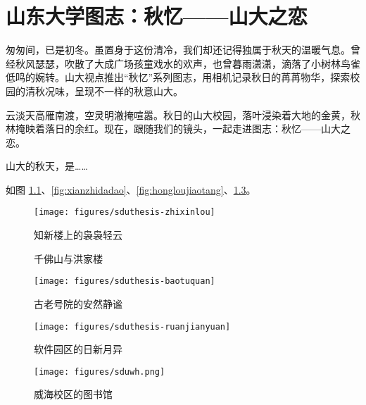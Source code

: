 \documentclass[openany]{sduthesis} %
\begin{document}
\chapter{山东大学图志：秋忆——山大之恋}

匆匆间，已是初冬。虽置身于这份清冷，我们却还记得独属于秋天的温暖气息。曾经秋风瑟瑟，吹散了大成广场孩童戏水的欢声，也曾暮雨潇潇，滴落了小树林鸟雀低鸣的婉转。山大视点推出“秋忆”系列图志，用相机记录秋日的苒苒物华，探索校园的清秋况味，呈现不一样的秋意山大。

云淡天高雁南渡，空灵明澈掩喧嚣。秋日的山大校园，落叶浸染着大地的金黄，秋林掩映着落日的余红。现在，跟随我们的镜头，一起走进图志：秋忆——山大之恋。

山大的秋天，是……

如图 \ref{fig:zhixinlou}、\ref{fig:xianzhidadao}、\ref{fig:hongloujiaotang}、\ref{fig:weihai}。

\begin{figure}[!htb]
\centering
\texttt{[image: figures/sduthesis-zhixinlou]}
\caption{知新楼上的袅袅轻云}\label{fig:zhixinlou}
\end{figure}

\begin{figure}[!htb]
\centering
{}\quad
{}\quad
\caption{千佛山与洪家楼}
\end{figure}

\begin{figure}[!htb]
\centering
\begin{minipage}{0.5\linewidth}
\centering
\texttt{[image: figures/sduthesis-baotuquan]}
\caption{古老号院的安然静谧}\label{fig:baotuquan}
\end{minipage}%
\begin{minipage}{0.5\linewidth}
\centering
\texttt{[image: figures/sduthesis-ruanjianyuan]}
\caption{软件园区的日新月异}\label{fig:ruanjianyuan}



\end{minipage}
\end{figure}

\begin{figure}[!htb]
\begin{minipage}{0.5\linewidth}
\centering
\texttt{[image: figures/sduwh.png]}
\caption{威海校区的图书馆}\label{fig:weihai}
\end{minipage}
\end{figure}
\end{document}
